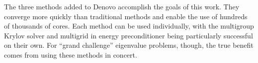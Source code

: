 \vspace*{0.5em}
\noindent       %
The three methods added to Denovo accomplish the goals of this work. They converge more quickly than traditional methods and enable the use of hundreds of thousands of cores. Each method can be used individually, with the multigroup Krylov solver and multigrid in energy preconditioner being particularly successful on their own. For ``grand challenge'' eigenvalue problems, though, the true benefit comes from using these methods in concert. 

